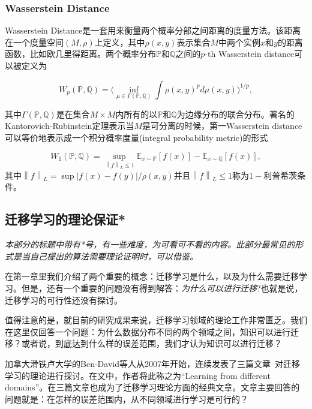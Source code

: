 \subsubsection{Wasserstein Distance}

Wasserstein Distance是一套用来衡量两个概率分部之间距离的度量方法。该距离在一个度量空间$(M,\rho)$上定义，其中$\rho(x,y)$表示集合$M$中两个实例$x$和$y$的距离函数，比如欧几里得距离。两个概率分布$\mathbb{P}$和$\mathbb{Q}$之间的$p{\text{-th}}$ Wasserstein distance可以被定义为

\begin{equation}
W_p(\mathbb{P}, \mathbb{Q}) = \Big(\inf_{\mu \in \Gamma(\mathbb{P}, \mathbb{Q}) } \int \rho(x,y)^p d\mu(x,y) \Big)^{1/p},
\end{equation}

其中$\Gamma(\mathbb{P}, \mathbb{Q})$是在集合$M\times M$内所有的以$\mathbb{P}$和$\mathbb{Q}$为边缘分布的联合分布。著名的Kantorovich-Rubinstein定理表示当$M$是可分离的时候，第一Wasserstein distance可以等价地表示成一个积分概率度量(integral probability metric)的形式

\begin{equation}
W_1(\mathbb{P},\mathbb{Q})= \sup_{\left \| f \right \|_L \leq 1} \mathbb{E}_{x \sim \mathbb{P}}[f(x)] - \mathbb{E}_{x \sim \mathbb{Q}}[f(x)],
\end{equation}
其中$\left \| f \right \|_L = \sup{|f(x) - f(y)|} / \rho(x,y)$并且$\left \| f \right \|_L \leq 1$称为$1-$利普希茨条件。

\subsection{迁移学习的理论保证*}
\textit{
本部分的标题中带有*号，有一些难度，为可看可不看的内容。此部分最常见的形式是当自己提出的算法需要理论证明时，可以借鉴。}

在第一章里我们介绍了两个重要的概念：迁移学习是什么，以及为什么需要迁移学习。但是，还有一个重要的问题没有得到解答：\textit{为什么可以进行迁移}?也就是说，迁移学习的可行性还没有探讨。

值得注意的是，就目前的研究成果来说，迁移学习领域的理论工作非常匮乏。我们在这里仅回答一个问题：为什么数据分布不同的两个领域之间，知识可以进行迁移？或者说，到底达到什么样的误差范围，我们才认为知识可以进行迁移？

加拿大滑铁卢大学的Ben-David等人从2007年开始，连续发表了三篇文章~\cite{ben2007analysis,blitzer2008learning,ben2010theory}对迁移学习的理论进行探讨。在文中，作者将此称之为“Learning from different domains”。在三篇文章也成为了迁移学习理论方面的经典文章。文章主要回答的问题就是：在怎样的误差范围内，从不同领域进行学习是可行的？

